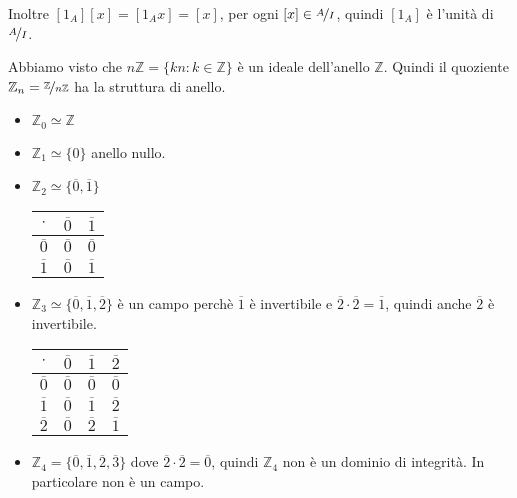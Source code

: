 \documentclass[../main.tex]{subfiles}
\begin{document}
Inoltre $[1_A] [x] = [1_A x] = [x] $, per ogni $[x] \in \nicefrac{A}{I}$, quindi $[1_A]$ è l'unità di $\nicefrac{A}{I}$.
\begin{example}
    Abbiamo visto che $n \mathbb{Z} = \{kn : k \in \mathbb{Z} \}$ è un ideale
    dell'anello $\mathbb{Z} $. Quindi il quoziente $\mathbb{Z}_n = \nicefrac{\mathbb{Z}}{n \mathbb{Z} }$ ha la struttura di anello.
    \begin{itemize}
        \item $\mathbb{Z}_0 \simeq \mathbb{Z} $
        \item $\mathbb{Z}_1 \simeq \{0\}$ anello nullo.
        \item $\mathbb{Z}_2 \simeq \{\overline{0}, \overline{1}\}$
              \begin{center}
                  \begin{tabular}{ c | c | c}
                      $\cdot$        & $\overline{0}$ & $\overline{1}$ \\ \hline
                      $\overline{0}$ & $\overline{0}$ & $\overline{0}$ \\ \hline
                      $\overline{1}$ & $\overline{0}$ & $\overline{1}$
                  \end{tabular}
              \end{center}
        \item $\mathbb{Z}_3 \simeq \{\overline{0}, \overline{1}, \overline{2}\}$ è un campo perchè $\overline{1}$ è invertibile e $\overline{2} \cdot \overline{2} = \overline{1}$, quindi anche $\overline{2}$ è invertibile.
              \begin{center}
                  \begin{tabular}{ c | c | c | c}
                      $\cdot$        & $\overline{0}$ & $\overline{1}$ & $\overline{2}$ \\ \hline
                      $\overline{0}$ & $\overline{0}$ & $\overline{0}$ & $\overline{0}$ \\ \hline
                      $\overline{1}$ & $\overline{0}$ & $\overline{1}$ & $\overline{2}$ \\ \hline
                      $\overline{2}$ & $\overline{0}$ & $\overline{2}$ & $\overline{1}$
                  \end{tabular}
              \end{center}
        \item $\mathbb{Z}_4 = \{\overline{0},\overline{1},\overline{2},\overline{3}\}$ dove $\overline{2} \cdot \overline{2} = \overline{0}$, quindi $\mathbb{Z}_4$ non è un dominio di integrità. In particolare non è un campo.

\end{itemize}
\end{example}
\end{document}
